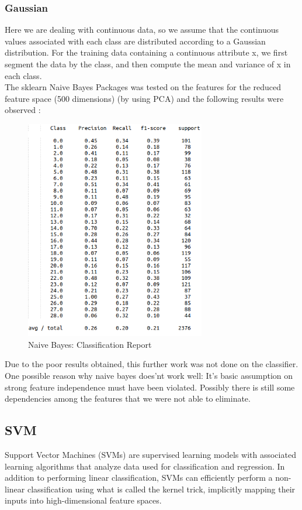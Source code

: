 \documentclass[12pt]{report}
\begin{document}
\subsubsection{Gaussian}
Here we are dealing with continuous data, so we assume that the continuous values associated with each class are distributed according to a Gaussian distribution. For the training data containing a continuous attribute x, we first segment the data by the class, and then compute the mean and variance of x in each class.\\

The sklearn Naive Bayes Packages was tested on the features for the reduced feature space (500 dimensions) (by using PCA) and the following results were observed :

\begin{figure}[H]
  \centering
  \includegraphics[width=0.7\textwidth]{Images/nb_g.png}
  \caption{Naive Bayes: Classification Report}
\end{figure}

Due to the poor results obtained, this further work was not done on the classifier.\\
One possible reason why naive bayes does'nt work well: It's basic assumption on strong feature independence must have been violated. Possibly there is still some dependencies among the features that we were not able to eliminate.\\


\subsection{SVM}
Support Vector Machines (SVMs) are supervised learning models with associated learning algorithms that analyze data used for classification and regression. In addition to performing linear classification, SVMs can efficiently perform a non-linear classification using what is called the kernel trick, implicitly mapping their inputs into high-dimensional feature spaces.
\end{document}
